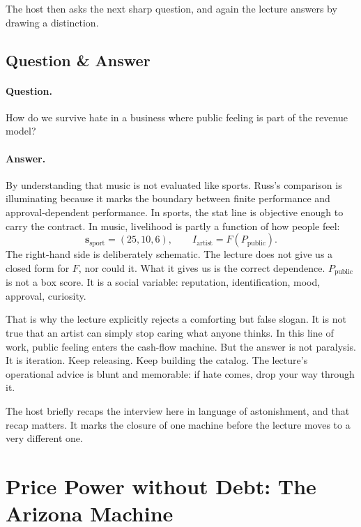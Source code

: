The host then asks the next sharp question, and again the lecture answers by drawing a distinction.

\subsection{Question \& Answer}

\paragraph{Question.} How do we survive hate in a business where public feeling is part of the revenue model?

\paragraph{Answer.} By understanding that music is not evaluated like sports. Russ's comparison is illuminating because it marks the boundary between finite performance and approval-dependent performance. In sports, the stat line is objective enough to carry the contract. In music, livelihood is partly a function of how people feel:
\begin{equation}
\mathbf{s}_{\mathrm{sport}}=(25,10,6),\qquad I_{\mathrm{artist}}=F\!\left(P_{\mathrm{public}}\right).
\end{equation}
The right-hand side is deliberately schematic. The lecture does not give us a closed form for \(F\), nor could it. What it gives us is the correct dependence. \(P_{\mathrm{public}}\) is not a box score. It is a social variable: reputation, identification, mood, approval, curiosity.

That is why the lecture explicitly rejects a comforting but false slogan. It is not true that an artist can simply stop caring what anyone thinks. In this line of work, public feeling enters the cash-flow machine. But the answer is not paralysis. It is iteration. Keep releasing. Keep building the catalog. The lecture's operational advice is blunt and memorable: if hate comes, drop your way through it.

The host briefly recaps the interview here in language of astonishment, and that recap matters. It marks the closure of one machine before the lecture moves to a very different one.

\section{Price Power without Debt: The Arizona Machine}

